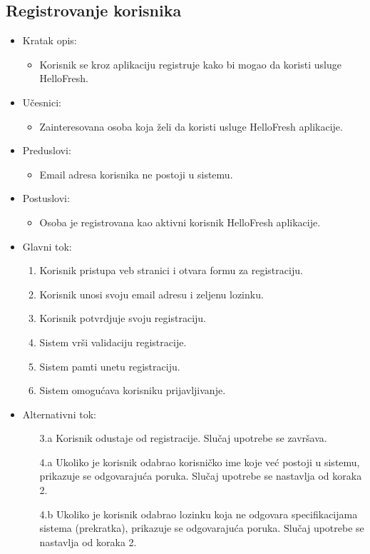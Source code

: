 \subsection{Registrovanje korisnika}

\begin{itemize}
    \item Kratak opis:
        \begin{itemize}
            \item Korisnik se kroz aplikaciju registruje kako bi mogao da koristi usluge HelloFresh.
        \end{itemize}
    \item Učesnici:
        \begin{itemize}
            \item Zainteresovana osoba koja želi da koristi usluge HelloFresh aplikacije.
        \end{itemize}
    \item Preduslovi:
        \begin{itemize}
            \item Email adresa korisnika ne postoji u sistemu.
        \end{itemize}
    \item Postuslovi:
        \begin{itemize}
            \item Osoba je registrovana kao aktivni korisnik HelloFresh aplikacije.
        \end{itemize}
    \item Glavni tok:
        \begin{enumerate}
            \item Korisnik pristupa veb stranici i otvara formu za registraciju.
            \item Korisnik unosi svoju email adresu i zeljenu lozinku.
            \item Korisnik potvrdjuje svoju registraciju.
            \item Sistem vrši validaciju registracije.
            \item Sistem pamti unetu registraciju.
            \item Sistem omogućava korisniku prijavljivanje.
        \end{enumerate}
    \item Alternativni tok:
        \begin{itemize}
            \item[3.a] Korisnik odustaje od registracije. Slučaj upotrebe se završava.
            \item[4.a] Ukoliko je korisnik odabrao korisničko ime koje već postoji u sistemu, prikazuje se odgovarajuća poruka. Slučaj upotrebe se nastavlja od koraka 2.
            \item[4.b] Ukoliko je korisnik odabrao lozinku koja ne odgovara specifikacijama sistema (prekratka), prikazuje se odgovarajuća poruka. Slučaj upotrebe se nastavlja od koraka 2.
        \end{itemize}
\end{itemize}
